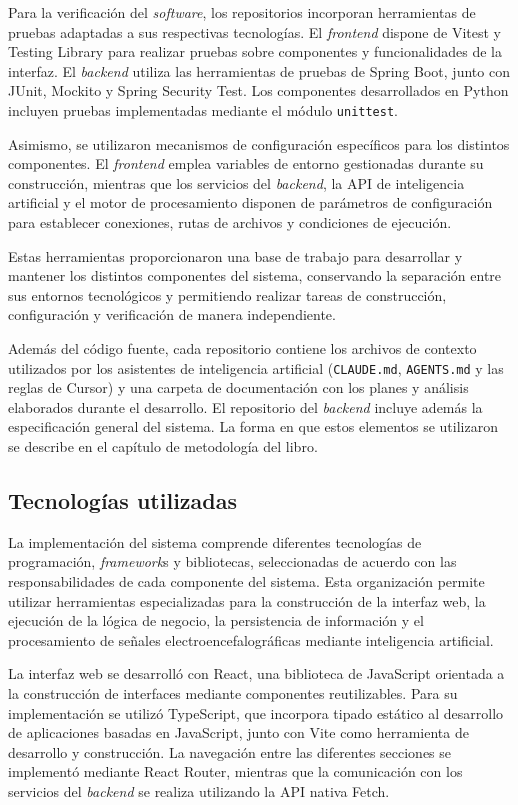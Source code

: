 Para la verificación del \textit{software}, los repositorios incorporan herramientas de pruebas adaptadas a sus respectivas tecnologías. El \textit{frontend} dispone de Vitest y Testing Library para realizar pruebas sobre componentes y funcionalidades de la interfaz. El \textit{backend} utiliza las herramientas de pruebas de Spring Boot, junto con JUnit, Mockito y Spring Security Test. Los componentes desarrollados en Python incluyen pruebas implementadas mediante el módulo \texttt{unittest}.

Asimismo, se utilizaron mecanismos de configuración específicos para los distintos componentes. El \textit{frontend} emplea variables de entorno gestionadas durante su construcción, mientras que los servicios del \textit{backend}, la API de inteligencia artificial y el motor de procesamiento disponen de parámetros de configuración para establecer conexiones, rutas de archivos y condiciones de ejecución.

Estas herramientas proporcionaron una base de trabajo para desarrollar y mantener los distintos componentes del sistema, conservando la separación entre sus entornos tecnológicos y permitiendo realizar tareas de construcción, configuración y verificación de manera independiente.


Además del código fuente, cada repositorio contiene los archivos de contexto utilizados por los asistentes de inteligencia artificial (\texttt{CLAUDE.md}, \texttt{AGENTS.md} y las reglas de Cursor) y una carpeta de documentación con los planes y análisis elaborados durante el desarrollo.
El repositorio del \textit{backend} incluye además la especificación general del sistema.
La forma en que estos elementos se utilizaron se describe en el capítulo de metodología del libro.

\subsection{Tecnologías utilizadas}

La implementación del sistema comprende diferentes tecnologías de
programación, \textit{framework}s y bibliotecas, seleccionadas de acuerdo con
las responsabilidades de cada componente del sistema. Esta organización
permite utilizar herramientas especializadas para la construcción de
la interfaz web, la ejecución de la lógica de negocio, la persistencia
de información y el procesamiento de señales electroencefalográficas
mediante inteligencia artificial.

La interfaz web se desarrolló con React, una biblioteca de JavaScript
orientada a la construcción de interfaces mediante componentes
reutilizables. Para su implementación se utilizó TypeScript, que
incorpora tipado estático al desarrollo de aplicaciones basadas en
JavaScript, junto con Vite como herramienta de desarrollo y
construcción. La navegación entre las diferentes secciones se
implementó mediante React Router, mientras que la comunicación con
los servicios del \textit{backend} se realiza utilizando la API nativa Fetch.

